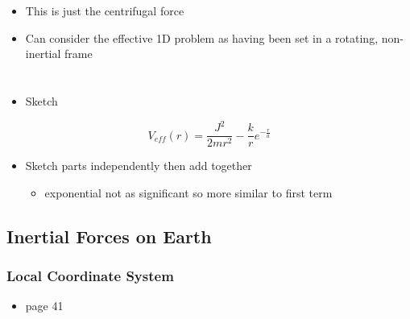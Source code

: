 \documentclass[a4paper,11pt,normalem]{article}
\begin{document}
\begin{itemize}
\item
  This is just the centrifugal force
\item
  Can consider the effective 1D problem as having been set in a
  rotating, non-inertial frame
\end{itemize}

\section{}\label{lecture-14}

\begin{example}[Homework]

\begin{itemize}
\item
  Sketch
\end{itemize}

\[
    V_{eff}(r) = \frac{J^2}{2mr^2} - \frac{k}{r}e^{-\frac{r}{a}}
\]

\begin{itemize}
\item
  Sketch parts independently then add together
  \begin{itemize}
  \item
    exponential not as significant so more similar to first term
  \end{itemize}
\end{itemize}
\end{example}

\subsection{Inertial Forces on Earth}\label{intertial-forces-on-earth}

\subsubsection{Local Coordinate System}\label{local-coordinate-system}

\begin{itemize}
\item
  page 41
\end{itemize}
\end{document}
